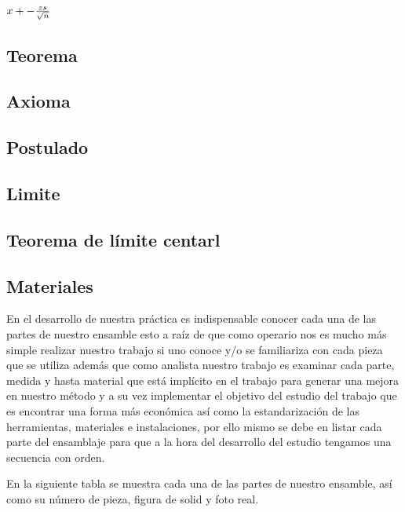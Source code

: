 \begin{center} 

${\-x}+-{\frac{zs}{\sqrt{n}}}$

\end{center}
\subsection{Teorema}
\subsection{}
\subsection{Axioma}
\subsection{Postulado}
\subsection{Limite}
\subsection{Teorema de límite centarl}











\subsection{Materiales}

En el desarrollo de nuestra práctica es indispensable conocer cada una de las partes de nuestro ensamble esto a raíz de que como operario nos es mucho más simple realizar nuestro trabajo si uno conoce y/o se familiariza con cada pieza que se utiliza además que como analista nuestro trabajo es examinar cada parte, medida y hasta material que está implícito en el trabajo para generar una mejora en nuestro método y a su vez implementar el objetivo del estudio del trabajo que es encontrar una forma más económica así como la estandarización de las herramientas, materiales e instalaciones, por ello mismo se debe en listar cada parte del ensamblaje para que a la hora del desarrollo del estudio tengamos una secuencia con orden.

En la siguiente tabla se muestra cada una de las partes de nuestro ensamble, así como su número de pieza, figura de solid y foto real.


